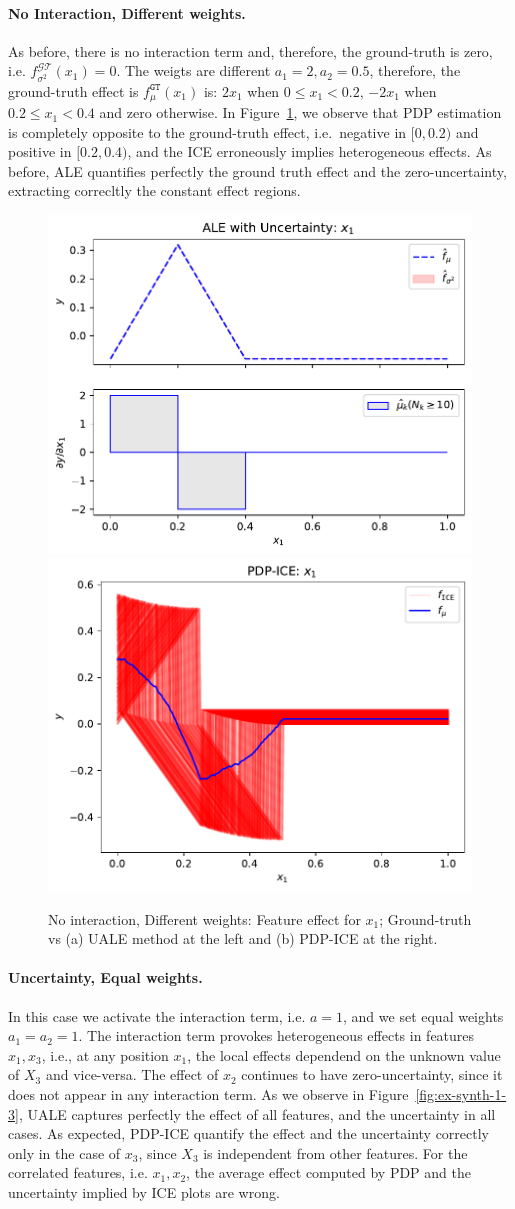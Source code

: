 \documentclass[twoside]{article}
\begin{document}
\paragraph{No Interaction, Different weights.}

As before, there is no interaction term and, therefore, the
ground-truth is zero, i.e.  \(f^{\mathcal{GT}}_{\sigma^2}(x_1) =
0\). The weigts are different \(a_1=2, a_2=0.5\), therefore, the
ground-truth effect is \(f_\mu^{\mathtt{GT}}(x_1)\) is: \(2x_1\) when
\(0 \leq x_1 < 0.2\), \(-2x_1\) when \(0.2 \leq x_1 < 0.4\) and zero
otherwise. In Figure~\ref{fig:ex-synth-1-2}, we observe that PDP
estimation is completely opposite to the ground-truth effect,
i.e.~negative in \([0, 0.2)\) and positive in \([0.2, 0.4)\), and the
ICE erroneously implies heterogeneous effects.  As before, ALE
quantifies perfectly the ground truth effect and the zero-uncertainty,
extracting correcltly the constant effect regions.

\begin{figure}[h]
  \centering
  \includegraphics[width=.23\textwidth]{example_2/dale_feat_0.pdf}
  \includegraphics[width=.23\textwidth]{example_2/pdp_ice_feat_0.pdf}
  \caption{No interaction, Different weights: Feature effect for \(x_1\);
    Ground-truth vs (a) UALE method at the left and (b) PDP-ICE at the
    right.}
  \label{fig:ex-synth-1-2}
\end{figure}

\paragraph{Uncertainty, Equal weights.}

In this case we activate the interaction term, i.e. \(a=1\), and we
set equal weights \(a_1=a_2=1\). The interaction term provokes
heterogeneous effects in features \(x_1, x_3\), i.e., at any position
\(x_1\), the local effects dependend on the unknown value of \(X_3\)
and vice-versa. The effect of \(x_2\) continues to have
zero-uncertainty, since it does not appear in any interaction term. As
we observe in Figure~\ref{fig:ex-synth-1-3}, UALE captures perfectly
the effect of all features, and the uncertainty in all cases. As
expected, PDP-ICE quantify the effect and the uncertainty correctly
only in the case of \(x_3\), since \(X_3\) is independent from other
features. For the correlated features, i.e. \(x_1, x_2\), the average
effect computed by PDP and the uncertainty implied by ICE plots are
wrong.
\end{document}
